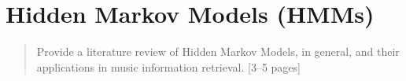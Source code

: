 \chapter{Hidden Markov Models (HMMs)}
\label{chap:chap1}

\begin{quote}
    Provide a literature review of Hidden Markov Models, in general, and their applications in music information retrieval. [3–5 pages]
\end{quote}
\clearpage









